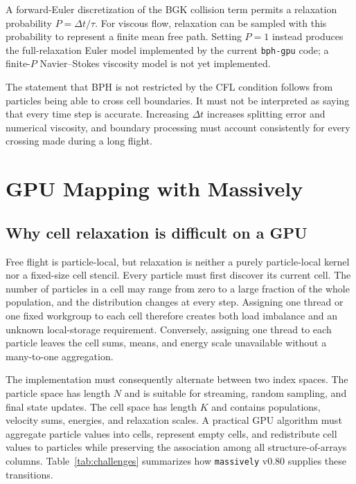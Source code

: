 \documentclass[a4paper,11pt]{article}
\newcommand{\bphgpu}{\texttt{bph-gpu}\xspace}
\newcommand{\massively}{\texttt{massively}\xspace}
\begin{document}
A forward-Euler discretization of the BGK collision term permits a relaxation
probability $P=\Delta t/\tau$.  For viscous flow, relaxation can be sampled with
this probability to represent a finite mean free path.  Setting $P=1$ instead
produces the full-relaxation Euler model implemented by the current \bphgpu
code; a finite-$P$ Navier--Stokes viscosity model is not yet implemented.

The statement that BPH is not restricted by the CFL condition follows from
particles being able to cross cell boundaries.  It must not be interpreted as
saying that every time step is accurate.  Increasing $\Delta t$ increases
splitting error and numerical viscosity, and boundary processing must account
consistently for every crossing made during a long flight.

\section{GPU Mapping with Massively}

\subsection{Why cell relaxation is difficult on a GPU}

Free flight is particle-local, but relaxation is neither a purely particle-local
kernel nor a fixed-size cell stencil.  Every particle must first discover its
current cell.  The number of particles in a cell may range from zero to a large
fraction of the whole population, and the distribution changes at every step.
Assigning one thread or one fixed workgroup to each cell therefore creates both
load imbalance and an unknown local-storage requirement.  Conversely, assigning
one thread to each particle leaves the cell sums, means, and energy scale
unavailable without a many-to-one aggregation.

The implementation must consequently alternate between two index spaces.  The
particle space has length $N$ and is suitable for streaming, random sampling,
and final state updates.  The cell space has length $K$ and contains populations,
velocity sums, energies, and relaxation scales.  A practical GPU algorithm must
aggregate particle values into cells, represent empty cells, and redistribute
cell values to particles while preserving the association among all
structure-of-arrays columns.  Table~\ref{tab:challenges} summarizes how
\massively v0.80 supplies these transitions.
\end{document}

